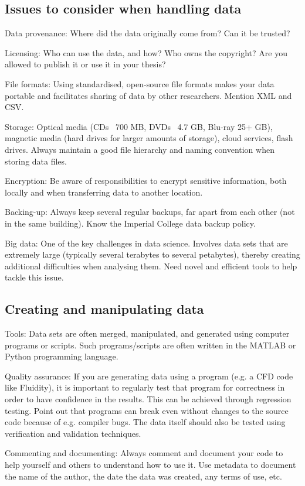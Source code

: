 \documentclass[a4paper,11pt]{article}
\begin{document}
\subsection{Issues to consider when handling data}
Data provenance: Where did the data originally come from? Can it be trusted?

Licensing: Who can use the data, and how? Who owns the copyright? Are you allowed to publish it or use it in your thesis?

File formats: Using standardised, open-source file formats makes your data portable and facilitates sharing of data by other researchers. Mention XML and CSV.

Storage: Optical media (CDs ~700 MB, DVDs ~4.7 GB, Blu-ray 25+ GB), magnetic media (hard drives for larger amounts of storage), cloud services, flash drives. Always maintain a good file hierarchy and naming convention when storing data files.

Encryption: Be aware of responsibilities to encrypt sensitive information, both locally and when transferring data to another location.

Backing-up: Always keep several regular backups, far apart from each other (not in the same building). Know the Imperial College data backup policy.

Big data: One of the key challenges in data science. Involves data sets that are extremely large (typically several terabytes to several petabytes), thereby creating additional difficulties when analysing them. Need novel and efficient tools to help tackle this issue.

\subsection{Creating and manipulating data}
Tools: Data sets are often merged, manipulated, and generated using computer programs or scripts. Such programs/scripts are often written in the MATLAB or Python programming language.

Quality assurance: If you are generating data using a program (e.g. a CFD code like Fluidity), it is important to regularly test that program for correctness in order to have confidence in the results. This can be achieved through regression testing. Point out that programs can break even without changes to the source code because of e.g. compiler bugs. The data itself should also be tested using verification and validation techniques.

Commenting and documenting: Always comment and document your code to help yourself and others to understand how to use it. Use metadata to document the name of the author, the date the data was created, any terms of use, etc.
\end{document}

